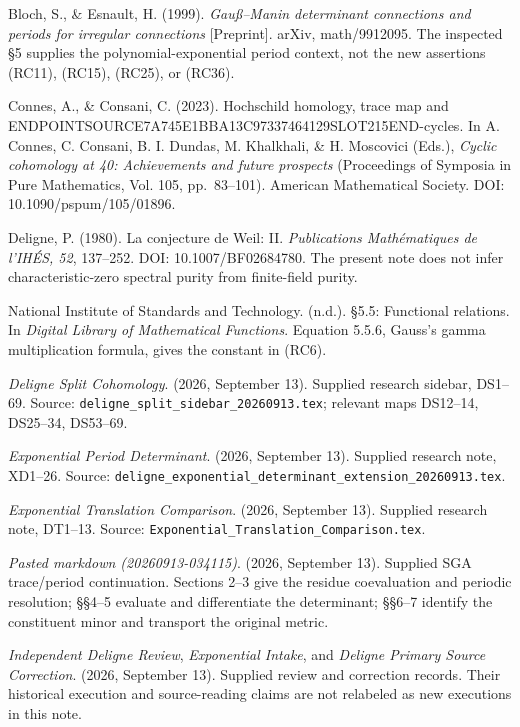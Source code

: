 Bloch, S., \& Esnault, H. (1999). \emph{Gauß--Manin determinant connections and periods for irregular connections} {[}Preprint{]}. arXiv, math/9912095. The inspected §5 supplies the polynomial-exponential period context, not the new assertions (RC11), (RC15), (RC25), or (RC36).

Connes, A., \& Consani, C. (2023). Hochschild homology, trace map and ENDPOINTSOURCE7A745E1BBA13C97337464129SLOT215END-cycles. In A. Connes, C. Consani, B. I. Dundas, M. Khalkhali, \& H. Moscovici (Eds.), \emph{Cyclic cohomology at 40: Achievements and future prospects} (Proceedings of Symposia in Pure Mathematics, Vol. 105, pp.~83--101). American Mathematical Society. DOI: 10.1090/pspum/105/01896.

Deligne, P. (1980). La conjecture de Weil: II. \emph{Publications Mathématiques de l'IHÉS, 52}, 137--252. DOI: 10.1007/BF02684780. The present note does not infer characteristic-zero spectral purity from finite-field purity.

National Institute of Standards and Technology. (n.d.). §5.5: Functional relations. In \emph{Digital Library of Mathematical Functions}. Equation 5.5.6, Gauss's gamma multiplication formula, gives the constant in (RC6).

\emph{Deligne Split Cohomology}. (2026, September 13). Supplied research sidebar, DS1--69. Source: \texttt{deligne\_split\_sidebar\_20260913.tex}; relevant maps DS12--14, DS25--34, DS53--69.

\emph{Exponential Period Determinant}. (2026, September 13). Supplied research note, XD1--26. Source: \texttt{deligne\_exponential\_determinant\_extension\_20260913.tex}.

\emph{Exponential Translation Comparison}. (2026, September 13). Supplied research note, DT1--13. Source: \texttt{Exponential\_Translation\_Comparison.tex}.

\emph{Pasted markdown (20260913-034115)}. (2026, September 13). Supplied SGA trace/period continuation. Sections 2--3 give the residue coevaluation and periodic resolution; §§4--5 evaluate and differentiate the determinant; §§6--7 identify the constituent minor and transport the original metric.

\emph{Independent Deligne Review}, \emph{Exponential Intake}, and \emph{Deligne Primary Source Correction}. (2026, September 13). Supplied review and correction records. Their historical execution and source-reading claims are not relabeled as new executions in this note.
